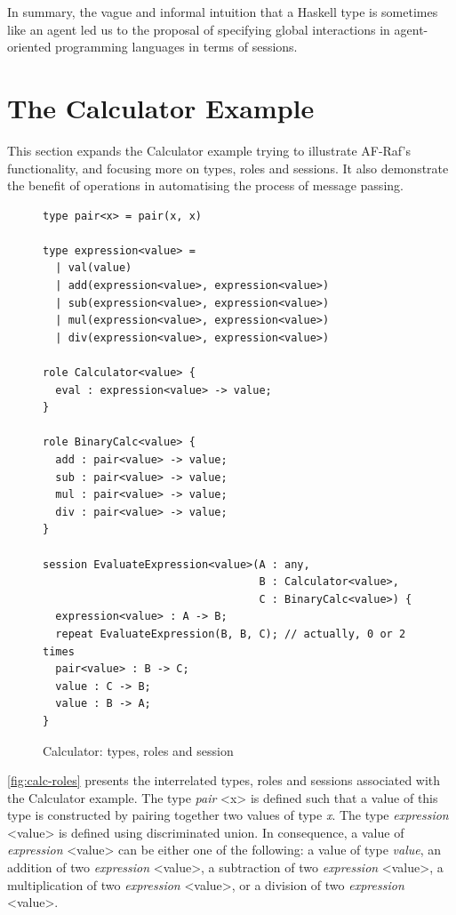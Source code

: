\documentclass[a4paper,12pt,oneside,fleqn]{book} %
\begin{document}
In summary, the vague and informal intuition that a Haskell type is
sometimes like an agent led us to the proposal of specifying global
interactions in agent-oriented programming languages in terms of sessions.

\section{The Calculator Example} %

This section expands the Calculator example trying to illustrate AF-Raf's
functionality, and focusing more on types, roles and sessions. It also
demonstrate the benefit of operations in automatising the process of
message passing.
\begin{figure}\footnotesize %
\begin{verbatim}
type pair<x> = pair(x, x)

type expression<value> =
  | val(value)
  | add(expression<value>, expression<value>)
  | sub(expression<value>, expression<value>)
  | mul(expression<value>, expression<value>)
  | div(expression<value>, expression<value>)

role Calculator<value> {
  eval : expression<value> -> value;
}

role BinaryCalc<value> {
  add : pair<value> -> value;
  sub : pair<value> -> value;
  mul : pair<value> -> value;
  div : pair<value> -> value;
}

session EvaluateExpression<value>(A : any,
                                  B : Calculator<value>,
                                  C : BinaryCalc<value>) {
  expression<value> : A -> B;
  repeat EvaluateExpression(B, B, C); // actually, 0 or 2 times
  pair<value> : B -> C;
  value : C -> B;
  value : B -> A;
}
\end{verbatim}
\caption{Calculator: types, roles and session}
\label{fig:calc-roles}
\end{figure} %

\autoref{fig:calc-roles} presents the interrelated types, roles and
sessions associated with the Calculator example. The type \textit{pair} <x>
is defined such that a value of this type is constructed by pairing
together two values of type \textit{x}. The type \textit{expression}
<value> is defined using discriminated union. In consequence, a value of
\textit{expression} <value> can be either one of the following: a value of
type \textit{value}, an addition of two \textit{expression} <value>, a
subtraction of two \textit{expression} <value>, a multiplication of two
\textit{expression} <value>, or a division of two \textit{expression}
<value>.
\end{document}

